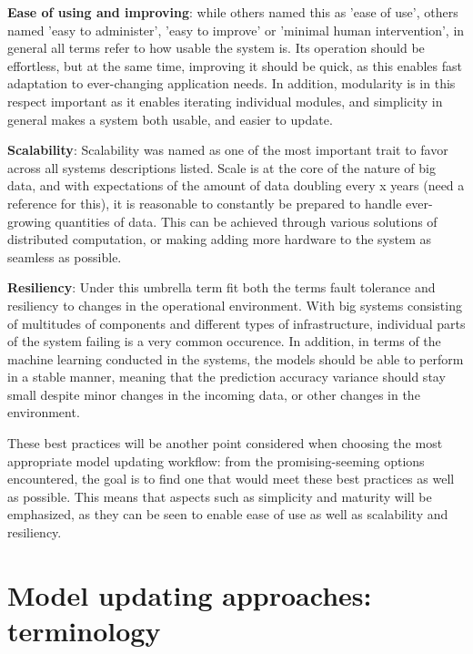 \textbf{Ease of using and improving}: while others named this as 'ease of use', others named 'easy to administer', 'easy to improve' or 'minimal human intervention', in general all terms refer to how usable the system is. Its operation should be effortless, but at the same time, improving it should be quick, as this enables fast adaptation to ever-changing application needs. In addition, modularity is in this respect important as it enables iterating individual modules, and simplicity in general makes a system both usable, and easier to update.

\textbf{Scalability}: Scalability was named as one of the most important trait to favor across all systems descriptions listed. Scale is at the core of the nature of big data, and with expectations of the amount of data doubling every x years (need a reference for this), it is reasonable to constantly be prepared to handle ever-growing quantities of data. This can be achieved through various solutions of distributed computation, or making adding more hardware to the system as seamless as possible.
    
\textbf{Resiliency}: Under this umbrella term fit both the terms fault tolerance and resiliency to changes in the operational environment. With big systems consisting of multitudes of components and different types of infrastructure, individual parts of the system failing is a very common occurence. In addition, in terms of the machine learning conducted in the systems, the models should be able to perform in a stable manner, meaning that the prediction accuracy variance should stay small despite minor changes in the incoming data, or other changes in the environment.




These best practices will be another point considered when choosing the most appropriate model updating workflow: from the promising-seeming options encountered, the goal is to find one that would meet these best practices as well as possible. This means that aspects such as simplicity and maturity will be emphasized, as they can be seen to enable ease of use as well as scalability and resiliency. 

\section{Model updating approaches: terminology}

